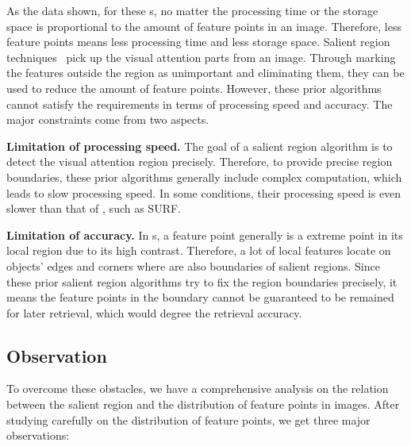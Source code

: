 As the data shown, for these {\lfea}s, no matter the processing time or the storage space is proportional to the amount of feature points in an image. Therefore, less feature points means  less processing time and less storage space.  Salient region techniques~\cite{cheng2011global,achanta2009frequency,itti1998model} pick up the visual attention parts from an image. Through marking the features outside the region as unimportant and eliminating them, they can be used to reduce the amount of feature points. However, these prior algorithms cannot satisfy the requirements in terms of processing speed and accuracy. The major constraints come from two aspects.
\squishlist
\item \textbf{Limitation of processing speed.} The goal of a salient region algorithm is to detect the visual attention region precisely. Therefore, to provide precise region boundaries, these prior algorithms generally include complex computation, which leads to slow processing speed. In some conditions, their processing speed is even slower than that of {\lfea}, such as SURF. 

\item \textbf{Limitation of accuracy.} In {\lfea}s, a feature point generally is a extreme point in its local region due to its high contrast. Therefore, a lot of local features locate on objects' edges and corners where are also boundaries of salient regions. Since these prior salient region algorithms try to fix the region boundaries precisely, it means the feature points in the boundary cannot be guaranteed to be remained for later retrieval, which would degree the retrieval accuracy. 
\squishend


\subsection{Observation}
\label{subsec:observation}

To overcome these obstacles, we have a comprehensive analysis on the relation between the salient region and the distribution of feature points in images. After studying carefully on the distribution of feature points, we get three major observations:

